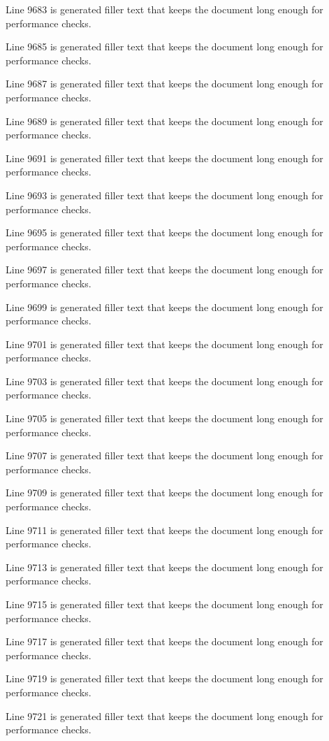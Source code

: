 Line 9683 is generated filler text that keeps the document long enough for performance checks.

Line 9685 is generated filler text that keeps the document long enough for performance checks.

Line 9687 is generated filler text that keeps the document long enough for performance checks.

Line 9689 is generated filler text that keeps the document long enough for performance checks.

Line 9691 is generated filler text that keeps the document long enough for performance checks.

Line 9693 is generated filler text that keeps the document long enough for performance checks.

Line 9695 is generated filler text that keeps the document long enough for performance checks.

Line 9697 is generated filler text that keeps the document long enough for performance checks.

Line 9699 is generated filler text that keeps the document long enough for performance checks.

Line 9701 is generated filler text that keeps the document long enough for performance checks.

Line 9703 is generated filler text that keeps the document long enough for performance checks.

Line 9705 is generated filler text that keeps the document long enough for performance checks.

Line 9707 is generated filler text that keeps the document long enough for performance checks.

Line 9709 is generated filler text that keeps the document long enough for performance checks.

Line 9711 is generated filler text that keeps the document long enough for performance checks.

Line 9713 is generated filler text that keeps the document long enough for performance checks.

Line 9715 is generated filler text that keeps the document long enough for performance checks.

Line 9717 is generated filler text that keeps the document long enough for performance checks.

Line 9719 is generated filler text that keeps the document long enough for performance checks.

Line 9721 is generated filler text that keeps the document long enough for performance checks.

